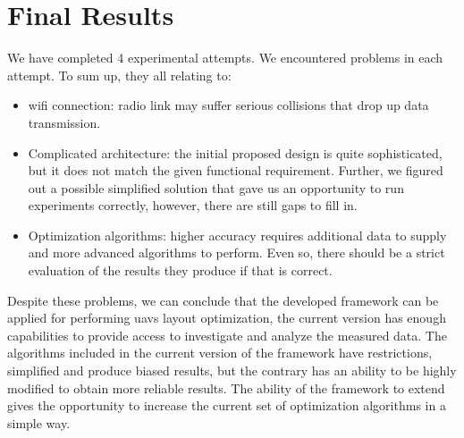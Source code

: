 \clearpage
\section{Final Results}\label{final-results}

We have completed 4 experimental attempts. We encountered problems in each attempt. To sum up, they all relating to:

\begin{itemize}
\tightlist
\item
  \gls{wifi} connection: radio link may suffer serious collisions that drop up data transmission.
\item
  Complicated architecture: the initial proposed design is quite sophisticated, but it does not match the given functional requirement. Further, we figured out a possible simplified solution that gave us an opportunity to run experiments correctly, however,  there are still gaps to fill in.
\item
  Optimization algorithms: higher accuracy requires additional data to supply and more advanced algorithms to perform. Even so, there should be a strict evaluation of the results they produce if that is correct.
\end{itemize}

Despite these problems, we can conclude that the developed framework can be applied for performing \glspl{uav} layout optimization, the current version has enough capabilities to provide access to investigate and analyze the measured data. The algorithms included in the current version of the framework have restrictions, simplified and produce biased results, but the contrary has an ability to be highly modified to obtain more reliable results. The ability of the framework to extend gives the opportunity to increase the current set of optimization algorithms in a simple way.
